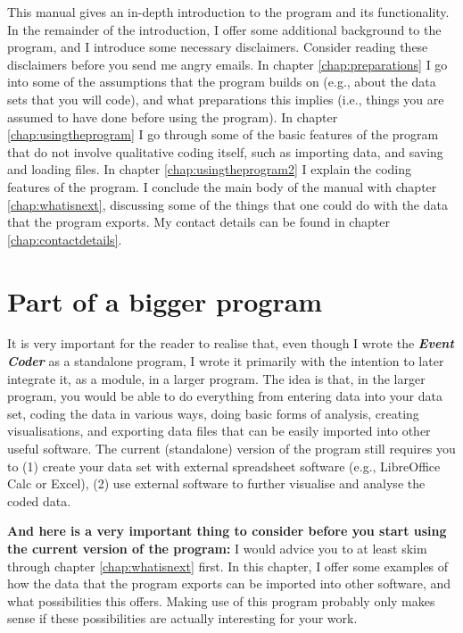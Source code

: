 \documentclass{memoir}
\begin{document}
This manual gives an in-depth introduction to the program and its functionality. In the remainder of the introduction, I offer some additional background to the program, and I introduce some necessary disclaimers. Consider reading these disclaimers before you send me angry emails. In chapter \ref{chap:preparations} I go into some of the assumptions that the program builds on (e.g., about the data sets that you will code), and what preparations this implies (i.e., things you are assumed to have done before using the program). In chapter \ref{chap:usingtheprogram} I go through some of the basic features of the program that do not involve qualitative coding itself, such as importing data, and saving and loading files. In chapter \ref{chap:usingtheprogram2} I explain the coding features of the program. I conclude the main body of the manual with chapter \ref{chap:whatisnext}, discussing some of the things that one could do with the data that the program exports. My contact details can be found in chapter \ref{chap:contactdetails}. 

\section{Part of a bigger program}
\label{sec:partofbiggerprogram}

It is very important for the reader to realise that, even though I wrote the \textbf{\emph{Event Coder}} as a standalone program, I wrote it primarily with the intention to later integrate it, as a module, in a larger program. The idea is that, in the larger program, you would be able to do everything from entering data into your data set, coding the data in various ways, doing basic forms of analysis, creating visualisations, and exporting data files that can be easily imported into other useful software. The current (standalone) version of the program still requires you to (1) create your data set with external spreadsheet software (e.g., LibreOffice Calc or Excel), (2) use external software to further visualise and analyse the coded data.

\textbf{And here is a very important thing to consider before you start using the current version of the program:} I would advice you to at least skim through chapter \ref{chap:whatisnext} first. In this chapter, I offer some examples of how the data that the program exports can be imported into other software, and what possibilities this offers. Making use of this program probably only makes sense if these possibilities are actually interesting for your work.
\end{document}
